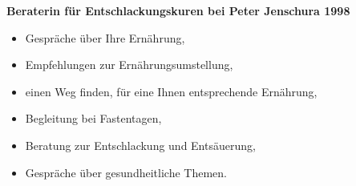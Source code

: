 \documentclass[10pt,foldmark,notumble]{leaflet}
\begin{document}
\vspace{2mm}

{\bf Beraterin für Entschlackungskuren bei Peter \mbox{Jenschura} 1998}\\
\begin{itemize}
\item  Gespräche über Ihre Ernährung,
\item  Empfehlungen zur Ernährungsumstellung,
\item  einen Weg finden, für eine Ihnen entsprechende Ernährung,
\item  Begleitung bei Fastentagen,
\item  Beratung zur Entschlackung und Entsäuerung,
\item  Gespräche über gesundheitliche Themen.
\end{itemize}




\end{document}
